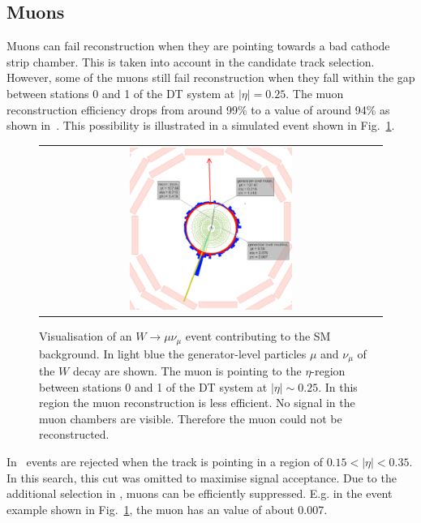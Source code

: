 \subsection*{Muons}
Muons can fail reconstruction when they are pointing towards a bad cathode strip chamber.
This is taken into account in the candidate track selection.
However, some of the muons still fail reconstruction when they fall within the gap between stations 0 and 1 of the DT system at $|\eta|=0.25$.
The muon reconstruction efficiency drops from around 99\% to a value of around 94\% as shown in~\cite{bib:CMS:DT_Thesis,bib:CMS:DT_8TeV_AN}.
This possibility is illustrated in a simulated event shown in Fig.~\ref{fig:LostMuon}.
\begin{figure}[!tb]
  \centering 
  \begin{tabular}{c}
    \includegraphics[width=0.49\textwidth]{figures/analysis/Background/LostMuon_Lumi_456307_event_182377157.png}
  \end{tabular}
  \caption{Visualisation of an $W\rightarrow \mu\nu_{\mu}$ event contributing to the SM background. 
           In light blue the generator-level particles $\mu$ and $\nu_{\mu}$ of the $W$ decay are shown. 
           The muon is pointing to the $\eta$-region between stations 0 and 1 of the DT system at $|\eta|\sim0.25$.
           In this region the muon reconstruction is less efficient. No signal in the muon chambers are visible. Therefore the  muon could not be reconstructed.}
  \label{fig:LostMuon}
\end{figure}


In~\cite{bib:CMS:DT_Thesis,bib:CMS:DT_8TeV_AN} events are rejected when the track is pointing in a region of $0.15<|\eta|<0.35$.
In this search, this cut was omitted to maximise signal acceptance. 
Due to the additional selection in \ias, muons can be efficiently suppressed.
E.g. in the event example shown in Fig.~\ref{fig:LostMuon}, the muon has an \ias value of about 0.007.\\

